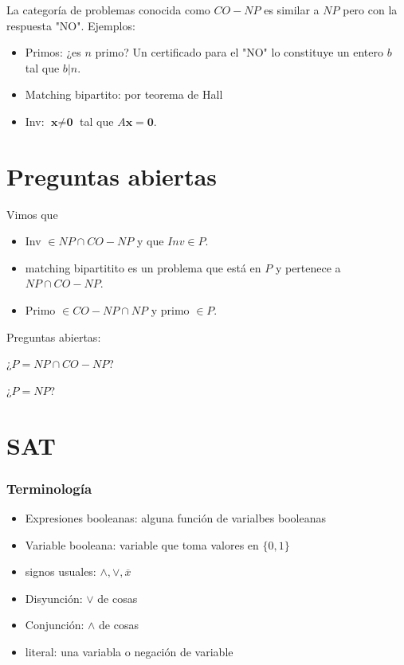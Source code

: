 \documentclass[10pt,a4paper]{article}
\begin{document}
La categoría de problemas conocida como $CO-NP$ es similar a $NP$ pero con la respuesta "NO". Ejemplos:

\begin{itemize}

	\item Primos: ¿es $n$ primo? Un certificado para el "NO" lo constituye un entero $b$ tal que $b |n$.
	\item Matching bipartito: por teorema de Hall
	\item Inv: $\textbf{x} \neq \textbf{0}$ tal que $A\textbf{x}= \textbf{0}$.
\end{itemize}

\section*{Preguntas abiertas}

Vimos que

\begin{itemize}

	\item Inv $\in NP \cap CO-NP$ y que $Inv \in P$.
	\item matching bipartitito es un problema que está en $P$ y pertenece a $NP \cap CO-NP$.
	\item Primo $\in CO-NP \cap NP$ y primo $\in P$.
\end{itemize}

Preguntas abiertas:

\begin{center}
¿$P = NP \cap CO-NP$?
\end{center}

\begin{center}
¿$P = NP$?
\end{center}

\section*{SAT}

\subsubsection*{Terminología}

\begin{itemize}

	\item Expresiones booleanas: alguna función de varialbes booleanas
	\item Variable booleana: variable que toma valores en $\{0, 1\}$
	\item signos usuales: $\land, \lor, \overline{x}$
	\item Disyunción: $\lor$ de cosas
	\item Conjunción: $\land$ de cosas
	\item literal: una variabla o negación de variable
\end{itemize}
\end{document}

